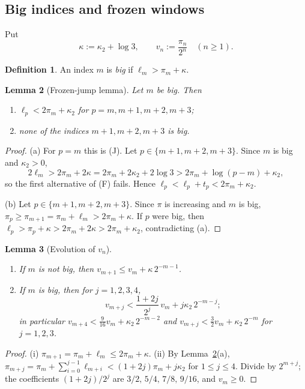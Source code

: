 \documentclass[11pt]{amsart}
\newtheorem{lemma}{Lemma}[section]
\theoremstyle{definition}
\newtheorem{definition}[lemma]{Definition}
\theoremstyle{remark}
\begin{document}
\subsection{Big indices and frozen windows}
Put
\[
\kappa:=\kappa_2+\log 3,\qquad v_n:=\frac{\pi_n}{2^n}\quad(n\ge1).
\]

\begin{definition}
An index $m$ is \emph{big} if $\ell_m>\pi_m+\kappa$.
\end{definition}

\begin{lemma}[Frozen-jump lemma]\label{lem:frozen}
Let $m$ be big. Then
\begin{enumerate}[label=\textup{(\alph*)}]
\item $\ell_p<2\pi_m+\kappa_2$ for $p=m,m+1,m+2,m+3$;
\item none of the indices $m+1,m+2,m+3$ is big.
\end{enumerate}
\end{lemma}

\begin{proof}
(a) For $p=m$ this is (J). Let $p\in\{m+1,m+2,m+3\}$. Since $m$ is big and
$\kappa_2>0$,
\[
2\ell_m>2\pi_m+2\kappa=2\pi_m+2\kappa_2+2\log3>2\pi_m+\log(p-m)+\kappa_2 ,
\]
so the first alternative of (F) fails. Hence $\ell_p<\ell_p+t_p<2\pi_m+\kappa_2$.

(b) Let $p\in\{m+1,m+2,m+3\}$. Since $\pi$ is increasing and $m$ is big,
$\pi_p\ge\pi_{m+1}=\pi_m+\ell_m>2\pi_m+\kappa$. If $p$ were big, then
$\ell_p>\pi_p+\kappa>2\pi_m+2\kappa>2\pi_m+\kappa_2$, contradicting (a).
\end{proof}

\begin{lemma}[Evolution of $v_n$]\label{lem:v}
\begin{enumerate}[label=\textup{(\roman*)}]
\item If $m$ is not big, then $v_{m+1}\le v_m+\kappa\,2^{-m-1}$.
\item If $m$ is big, then for $j=1,2,3,4$,
\[
v_{m+j}<\frac{1+2j}{2^j}\,v_m+j\kappa_2\,2^{-m-j};
\]
in particular $v_{m+4}<\tfrac{9}{16}v_m+\kappa_2\,2^{-m-2}$ and
$v_{m+j}<\tfrac32v_m+\kappa_2\,2^{-m}$ for $j=1,2,3$.
\end{enumerate}
\end{lemma}

\begin{proof}
(i) $\pi_{m+1}=\pi_m+\ell_m\le2\pi_m+\kappa$. (ii) By Lemma~\ref{lem:frozen}(a),
$\pi_{m+j}=\pi_m+\sum_{i=0}^{j-1}\ell_{m+i}<(1+2j)\pi_m+j\kappa_2$ for $1\le j\le4$.
Divide by $2^{m+j}$; the coefficients $(1+2j)/2^j$ are $3/2,\,5/4,\,7/8,\,9/16$, and
$v_m\ge0$.
\end{proof}
\end{document}
